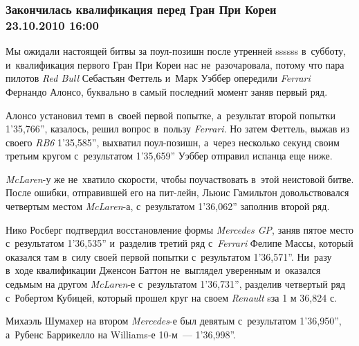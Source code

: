 \documentclass[12pt]{article}
\renewcommand{\emph}[1]{{\it #1}}
\newcommand{\myemph}[1]{{\sf #1}}
\begin{document}
\subsubsection*{Закончилась квалификация перед Гран При Кореи\\
\footnotesize{23.10.2010 16:00}}

\myemph{Мы ожидали} настоящей битвы за поул-позишн после утренней ssssss
в~субботу, и~квалификация первого Гран При Кореи нас не~разочаровала,
потому что пара пилотов \emph{Red Bull} Себастьян Феттель и~Марк Уэббер
опередили \emph{Ferrari} Фернандо Алонсо, буквально в самый последний
момент заняв первый ряд.

Алонсо установил темп в~своей первой попытке, а~результат второй попытки
1'35,766'', казалось, решил вопрос в~пользу \emph{Ferrari}.
Но затем Феттель, выжав из своего \emph{RB6} 1'35,585'', выхватил
поул-позишн, а~через несколько секунд своим третьим кругом
с~результатом 1'35,659'' Уэббер отправил испанца еще ниже.

\emph{McLaren}-у же не~хватило скорости, чтобы поучаствовать
в~этой неистовой битве. После ошибки, отправившей его на пит-лейн,
Льюис Гамильтон довольствовался четвертым местом \emph{McLaren}-а,
с~результатом 1'36,062'' заполнив второй ряд.

Нико Росберг подтвердил восстановление формы \emph{Mercedes GP},
заняв пятое место с~результатом 1'36,535'' и~разделив третий ряд
с~\emph{Ferrari} Фелипе Массы, который оказался там в~силу своей
первой попытки с~результатом 1'36,571''. Ни~разу в~ходе квалификации
Дженсон Баттон не~выглядел уверенным и~оказался седьмым на другом
\emph{McLaren}-е с~результатом 1'36,731'', разделив четвертый ряд
с~Робертом Кубицей, который прошел круг на своем \emph{Renault}
sза 1 м 36,824 с.

Михаэль Шумахер на втором \emph{Mercedes}-е был девятым
с~результатом 1'36,950'', а~Рубенс Баррикелло
на Williams-е 10-м~--- 1'36,998''.
\end{document}
